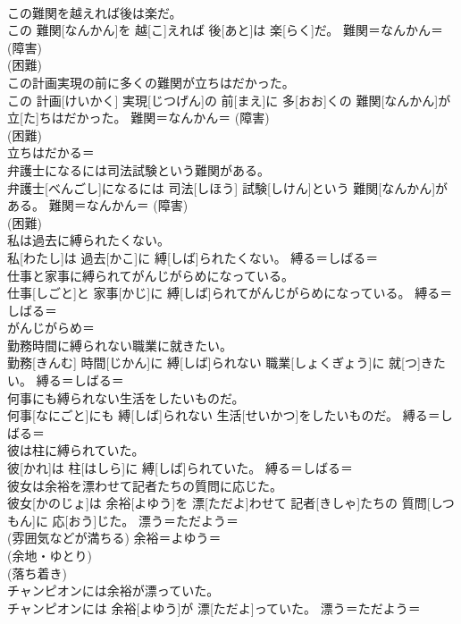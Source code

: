 \documentclass[8pt]{extreport}
\begin{document}
\begin{CJK}{UTF8}{min}
{\\	この難関を越えれば後は楽だ。	
\\	この 難関[なんかん]を 越[こ]えれば 後[あと]は 楽[らく]だ。	難関＝なんかん＝ (障害) 
\\	(困難) 
\\	この計画実現の前に多くの難関が立ちはだかった。	
\\	この 計画[けいかく] 実現[じつげん]の 前[まえ]に 多[おお]くの 難関[なんかん]が 立[た]ちはだかった。	難関＝なんかん＝ (障害) 
\\	(困難) 
\\	立ちはだかる＝ 
\\	弁護士になるには司法試験という難関がある。	
\\	弁護士[べんごし]になるには 司法[しほう] 試験[しけん]という 難関[なんかん]がある。	難関＝なんかん＝ (障害) 
\\	(困難) 
\\	私は過去に縛られたくない。	
\\	私[わたし]は 過去[かこ]に 縛[しば]られたくない。	縛る＝しばる＝ 
\\	仕事と家事に縛られてがんじがらめになっている。	
\\	仕事[しごと]と 家事[かじ]に 縛[しば]られてがんじがらめになっている。	縛る＝しばる＝ 
\\	がんじがらめ＝ 
\\	勤務時間に縛られない職業に就きたい。	
\\	勤務[きんむ] 時間[じかん]に 縛[しば]られない 職業[しょくぎょう]に 就[つ]きたい。	縛る＝しばる＝ 
\\	何事にも縛られない生活をしたいものだ。	
\\	何事[なにごと]にも 縛[しば]られない 生活[せいかつ]をしたいものだ。	縛る＝しばる＝ 
\\	彼は柱に縛られていた。	
\\	彼[かれ]は 柱[はしら]に 縛[しば]られていた。	縛る＝しばる＝ 
\\	彼女は余裕を漂わせて記者たちの質問に応じた。	
\\	彼女[かのじょ]は 余裕[よゆう]を 漂[ただよ]わせて 記者[きしゃ]たちの 質問[しつもん]に 応[おう]じた。	漂う＝ただよう＝ 
\\	(雰囲気などが満ちる) 余裕＝よゆう＝ 
\\	(余地・ゆとり) 
\\	(落ち着き) 
\\	チャンピオンには余裕が漂っていた。	
\\	チャンピオンには 余裕[よゆう]が 漂[ただよ]っていた。	漂う＝ただよう＝ 
}
\end{CJK}
\end{document}
